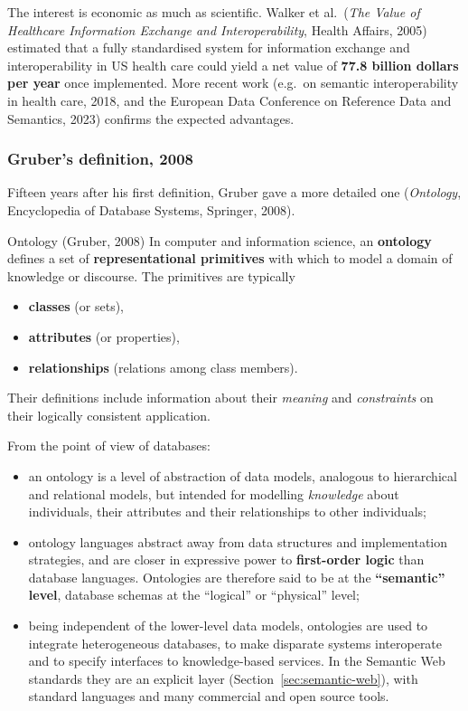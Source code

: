 \begin{nbwhy}
The interest is economic as much as scientific. Walker et al.\ (\emph{The Value of
Healthcare Information Exchange and Interoperability}, Health Affairs, 2005) estimated
that a fully standardised system for information exchange and interoperability in US
health care could yield a net value of \textbf{77.8 billion dollars per year} once
implemented. More recent work (e.g.\ on semantic interoperability in health care, 2018,
and the European Data Conference on Reference Data and Semantics, 2023) confirms the
expected advantages.
\end{nbwhy}

\subsubsection{Gruber's definition, 2008}

Fifteen years after his first definition, Gruber gave a more detailed one (\emph{Ontology},
Encyclopedia of Database Systems, Springer, 2008).

\begin{nbdef}{Ontology (Gruber, 2008)}
In computer and information science, an \textbf{ontology} defines a set of
\textbf{representational primitives} with which to model a domain of knowledge or
discourse. The primitives are typically
\begin{itemize}[nosep]
  \item \textbf{classes} (or sets),
  \item \textbf{attributes} (or properties),
  \item \textbf{relationships} (relations among class members).
\end{itemize}
Their definitions include information about their \emph{meaning} and \emph{constraints}
on their logically consistent application.
\end{nbdef}

From the point of view of databases:
\begin{itemize}[nosep]
  \item an ontology is a level of abstraction of data models, analogous to hierarchical
        and relational models, but intended for modelling \emph{knowledge} about
        individuals, their attributes and their relationships to other individuals;
  \item ontology languages abstract away from data structures and implementation
        strategies, and are closer in expressive power to \textbf{first-order logic} than
        database languages. Ontologies are therefore said to be at the
        \textbf{``semantic'' level}, database schemas at the ``logical'' or ``physical''
        level;
  \item being independent of the lower-level data models, ontologies are used to
        integrate heterogeneous databases, to make disparate systems interoperate and to
        specify interfaces to knowledge-based services. In the Semantic Web standards
        they are an explicit layer (Section~\ref{sec:semantic-web}), with standard
        languages and many commercial and open source tools.
\end{itemize}

